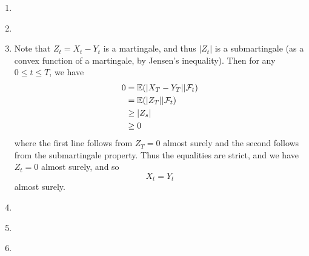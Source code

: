 \begin{enumerate}
\item \label{item:9}
\item \label{item:10}
\item \label{item:11} Note that $Z_{t} = X_{t} - Y_{t}$ is a
  martingale, and thus $|Z_{t}|$ is a submartingale (as a convex
  function of a martingale, by Jensen's inequality). Then for any $0 \leq t \leq
  T$, we have
  \begin{align}
    \label{eq:1}
    0 &= \E{|X_{T} - Y_{T}| | \mathcal{F}_{t}} \\
    &= \E{|Z_{T}| | \mathcal{F}_{t}} \\
    &\geq |Z_{s}| \\
    &\geq 0
  \end{align} where the first line follows from $Z_{T} = 0$ almost
  surely and the second follows from the submartingale property. Thus
  the equalities are strict, and we have $Z_{t} = 0$ almost surely,
  and so
  \begin{equation}
    \label{eq:3}
    X_{t} = Y_{t}
  \end{equation} almost surely.
\item \label{item:12} 
\item \label{item:13}
\item \label{item:14}
\end{enumerate}



